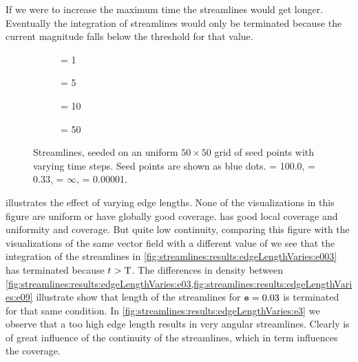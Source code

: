 If we were to increase the maximum time the streamlines would get longer. Eventually the integration of streamlines would only be terminated because the current magnitude falls below the threshold for that value.
%
\begin{figure}
	\centering
	\begin{subfigure}{0.44\textwidth}
		\centering
		\caption{\timeStep = 1}
		\label{fig:streamlines:results:timeStepVaries:t1}
	\end{subfigure}		
	\begin{subfigure}{0.44\textwidth}
		\centering
		\caption{\timeStep = 5}
		\label{fig:streamlines:results:timeStepVaries:t5}
	\end{subfigure}			
	\begin{subfigure}{0.44\textwidth}
		\centering
		\caption{\timeStep = 10}
		\label{fig:streamlines:results:timeStepVaries:t10}
	\end{subfigure}				
	\begin{subfigure}{0.44\textwidth}
		\centering
		\caption{\timeStep = 50}
		\label{fig:streamlines:results:timeStepVaries:t50}
	\end{subfigure}	
	\caption{Streamlines, seeded on an uniform $50 \times 50$ grid of seed points with varying time steps. Seed points are shown as blue dots. \timeStepMax = 100.0, \edgeLength = 0.33, \edgeLengthMax = $\infty$, \magnitudeMin = 0.00001.}
	\label{fig:streamlines:results:timeStepVaries}
\end{figure}
%
 illustrates the effect of varying edge lengths. None of the visualizations in this figure are uniform or have globally good coverage.  has good local coverage and uniformity and coverage. But quite low continuity, comparing this figure with the visualizations of the same vector field with a different value of \edgeLength we see that the integration of the streamlines in \cref{fig:streamlines:results:edgeLengthVaries:e003} has terminated because $t > \text{T}$. The differences in density between \cref{fig:streamlines:results:edgeLengthVaries:e03,fig:streamlines:results:edgeLengthVaries:e09} illustrate show that length of the streamlines for $\mathtt{e} = 0.03$ is terminated for that same condition. In \cref{fig:streamlines:results:edgeLengthVaries:e3} we observe that a too high edge length results in very angular streamlines. Clearly \edgeLength is of great influence of the continuity of the streamlines, which in term influences the coverage. 

